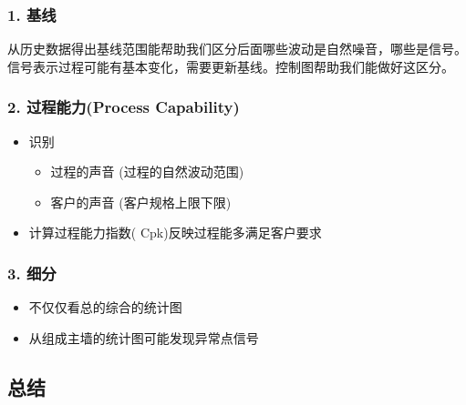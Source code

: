 \hypertarget{ux57faux7ebf}{%
\subsubsection{1. 基线}\label{ux57faux7ebf}}

从历史数据得出基线范围能帮助我们区分后面哪些波动是自然噪音，哪些是信号。
信号表示过程可能有基本变化，需要更新基线。控制图帮助我们能做好这区分。

\hypertarget{ux8fc7ux7a0bux80fdux529bprocess-capability}{%
\subsubsection{2. 过程能力(Process
Capability)}\label{ux8fc7ux7a0bux80fdux529bprocess-capability}}

\begin{itemize}
\tightlist
\item
  识别

  \begin{itemize}
  \tightlist
  \item
    过程的声音 (过程的自然波动范围)
  \item
    客户的声音 (客户规格上限下限)
  \end{itemize}
\item
  计算过程能力指数( Cpk)反映过程能多满足客户要求
\end{itemize}

\hypertarget{ux7ec6ux5206}{%
\subsubsection{3. 细分}\label{ux7ec6ux5206}}

\begin{itemize}
\tightlist
\item
  不仅仅看总的综合的统计图
\item
  从组成主墙的统计图可能发现异常点信号
\end{itemize}

\begin{description}
\item[]
\end{description}

\hypertarget{ux603bux7ed3}{%
\subsection{总结}\label{ux603bux7ed3}}

